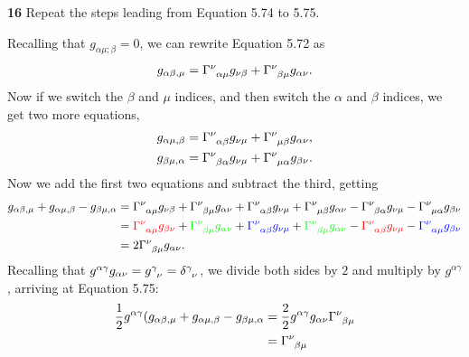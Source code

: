 \documentclass[gr-notes.tex]{subfiles}
\begin{document}
\textbf{16}
Repeat the steps leading from Equation 5.74 to 5.75.

Recalling that $g_{\alpha\mu;\beta} = 0$, we can rewrite Equation 5.72 as
%
\begin{displaymath}
  g_{\alpha\beta,\mu} =
  \tensor{\Gamma}{^\nu_{\alpha\mu}} g_{\nu\beta} +
  \tensor{\Gamma}{^\nu_{\beta\mu}} g_{\alpha\nu}.
\end{displaymath}
%
Now if we switch the $\beta$ and $\mu$ indices, and then switch the $\alpha$ and $\beta$ indices, we get two more equations,
%
\begin{align*}
  g_{\alpha\mu,\beta} &=
  \tensor{\Gamma}{^\nu_{\alpha\beta}} g_{\nu\mu} +
  \tensor{\Gamma}{^\nu_{\mu\beta}} g_{\alpha\nu},
  \\*
  g_{\beta\mu,\alpha} &=
  \tensor{\Gamma}{^\nu_{\beta\alpha}} g_{\nu\mu} +
  \tensor{\Gamma}{^\nu_{\mu\alpha}} g_{\beta\nu}.
\end{align*}
%
Now we add the first two equations and subtract the third, getting
%
\begin{align*}
  g_{\alpha\beta,\mu} + g_{\alpha\mu,\beta} - g_{\beta\mu,\alpha} &=
  \tensor{\Gamma}{^\nu_{\alpha\mu}} g_{\nu\beta} +
  \tensor{\Gamma}{^\nu_{\beta\mu}} g_{\alpha\nu} +
  \tensor{\Gamma}{^\nu_{\alpha\beta}} g_{\nu\mu} +
  \tensor{\Gamma}{^\nu_{\mu\beta}} g_{\alpha\nu} -
  \tensor{\Gamma}{^\nu_{\beta\alpha}} g_{\nu\mu} -
  \tensor{\Gamma}{^\nu_{\mu\alpha}} g_{\beta\nu}
  \\ &=
  {\color{red}
  \tensor{\Gamma}{^\nu_{\alpha\mu}} g_{\beta\nu}} +
  {\color{green}
  \tensor{\Gamma}{^\nu_{\beta\mu}} g_{\alpha\nu}} +
  {\color{blue}
  \tensor{\Gamma}{^\nu_{\alpha\beta}} g_{\nu\mu}} +
  {\color{green}
  \tensor{\Gamma}{^\nu_{\beta\mu}} g_{\alpha\nu}} -
  {\color{red}
  \tensor{\Gamma}{^\nu_{\alpha\beta}} g_{\nu\mu}} -
  {\color{blue}
  \tensor{\Gamma}{^\nu_{\alpha\mu}} g_{\beta\nu}}
  \\ &=
  2 \tensor{\Gamma}{^\nu_{\beta\mu}} g_{\alpha\nu}.
\end{align*}
%
Recalling that $g^{\alpha\gamma} g_{\alpha\nu} = \tensor{g}{^\gamma_\nu} = \tensor{\delta}{^\gamma_\nu}$, we divide both sides by $2$ and multiply by $g^{\alpha\gamma}$, arriving at Equation 5.75:
%
\begin{align*}
  \frac{1}{2}
  g^{\alpha\gamma}
  (g_{\alpha\beta,\mu} + g_{\alpha\mu,\beta} - g_{\beta\mu,\alpha} &=
  \frac{2}{2}
  g^{\alpha\gamma} g_{\alpha\nu}
  \tensor{\Gamma}{^\nu_{\beta\mu}}
  \\ &=
  \tensor{\Gamma}{^\nu_{\beta\mu}}
\end{align*}
\end{document}
